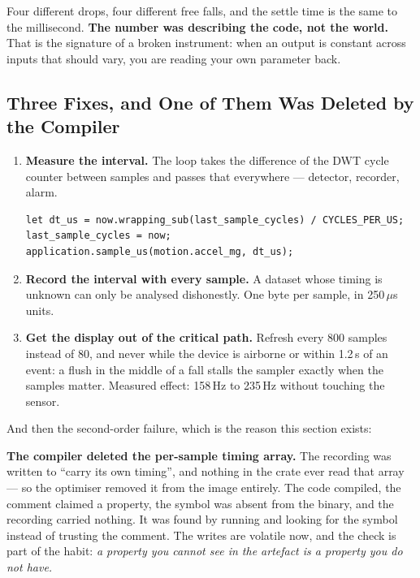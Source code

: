 Four different drops, four different free falls, and the settle time is the same to the
millisecond. \textbf{The number was describing the code, not the world.} That is the signature
of a broken instrument: when an output is constant across inputs that should vary, you are
reading your own parameter back.

\subsection{Three Fixes, and One of Them Was Deleted by the Compiler}

\begin{enumerate}
    \item \textbf{Measure the interval.} The loop takes the difference of the DWT cycle
          counter between samples and passes that everywhere — detector, recorder, alarm.
          \begin{verbatim}
let dt_us = now.wrapping_sub(last_sample_cycles) / CYCLES_PER_US;
last_sample_cycles = now;
application.sample_us(motion.accel_mg, dt_us);
          \end{verbatim}
    \item \textbf{Record the interval with every sample.} A dataset whose timing is unknown
          can only be analysed dishonestly. One byte per sample, in 250\,$\mu$s units.
    \item \textbf{Get the display out of the critical path.} Refresh every 800 samples instead
          of 80, and never while the device is airborne or within 1.2\,s of an event: a flush
          in the middle of a fall stalls the sampler exactly when the samples matter. Measured
          effect: 158\,Hz to 235\,Hz without touching the sensor.
\end{enumerate}

And then the second-order failure, which is the reason this section exists:

\begin{warningbox}
    \textbf{The compiler deleted the per-sample timing array.} The recording was written to
    ``carry its own timing'', and nothing in the crate ever read that array — so the optimiser
    removed it from the image entirely. The code compiled, the comment claimed a property, the
    symbol was absent from the binary, and the recording carried nothing. It was found by
    running  and looking for the symbol instead of trusting the
    comment. The writes are volatile now, and the check is part of the habit: \emph{a property
    you cannot see in the artefact is a property you do not have.}
\end{warningbox}

